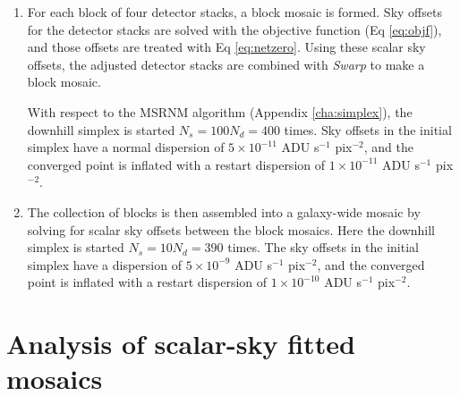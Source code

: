 \documentclass[iop]{emulateapj}
\newcommand{\ie}{\textit{i.e.}}
\newcommand{\vect}[1]{\boldsymbol{#1}} %
\newcommand{\sw}[1]{\textit{#1}} %
\begin{document}
\begin{enumerate}
    \item\label{ls:blockopt} For each block of four detector stacks, a block mosaic is formed. Sky offsets for the detector stacks are solved with the objective function (Eq \ref{eq:objf}), and those offsets are treated with Eq \ref{eq:netzero}. Using these scalar sky offsets, the adjusted detector stacks are combined with \sw{Swarp} to make a block mosaic.
    
    With respect to the MSRNM algorithm (Appendix \ref{cha:simplex}), the downhill simplex is started $N_s=100N_d=400$ times. Sky offsets in the initial simplex have a normal dispersion of $5\times10^{-11}$ ADU s$^{-1}$ pix$^{-2}$, and the converged point is inflated with a restart dispersion of $1\times10^{-11}$ ADU s$^{-1}$ pix$^{-2}$.
    
    \item\label{ls:mosaicopt} The collection of blocks is then assembled into a galaxy-wide mosaic by solving for scalar sky offsets between the block mosaics. Here the downhill simplex is started $N_s=10N_d=390$ times. The sky offsets in the initial simplex have a dispersion of $5\times10^{-9}$ ADU s$^{-1}$ pix$^{-2}$, and the converged point is inflated with a restart dispersion of $1\times10^{-10}$ ADU s$^{-1}$ pix$^{-2}$.

\end{enumerate}

\section{Analysis of scalar-sky fitted mosaics}
\label{sec:scalaranalysis}

\end{document}
